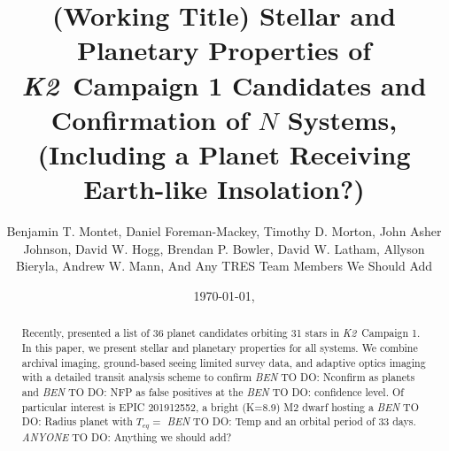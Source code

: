 \documentclass{emulateapj}
\newcommand{\project}[1]{\textsl{#1}}
\newcommand{\KT}{\project{K2}}
\newcommand{\paperit}{\citet{Foreman-Mackey15}}
\newcommand{\todo}[3]{{\color{#2} \emph{#1} TO DO: #3}}
\newcommand{\btmtodo}[1]{\todo{BEN}{red}{#1}}
\newcommand{\anytodo}[1]{\todo{ANYONE}{NavyBlue}{#1}}
\begin{document}
\title{(Working Title) Stellar and Planetary Properties of \KT\ Campaign 1
Candidates and Confirmation of $N$ Systems, (Including a Planet Receiving 
Earth-like Insolation?)}

\author{
Benjamin T. Montet, 
Daniel Foreman-Mackey,
Timothy D. Morton,
John Asher Johnson,
David W. Hogg,
Brendan P. Bowler,
David W. Latham,
Allyson Bieryla,
Andrew W. Mann,
And Any TRES Team Members We Should Add
}




\date{\today, \currenttime}

\begin{abstract}
Recently, \paperit{} presented a list of 36 planet candidates orbiting
31 stars in \KT\ Campaign 1. 
In this paper, we present stellar and planetary properties for all systems.
We combine archival imaging, ground-based seeing limited survey data, and
adaptive optics imaging with a detailed transit analysis scheme to confirm 
\btmtodo{Nconfirm} as planets and \btmtodo{NFP} as false positives
at the \btmtodo{confidence} level.
Of particular interest is EPIC 201912552, a bright (K=8.9) M2 dwarf
hosting a \btmtodo{Radius} planet with $T_{eq} = $\btmtodo{Temp} and an 
orbital period of 33 days.
\anytodo{Anything we should add?}
\end{abstract}

\keywords{\btmtodo{Keywords}}

\maketitle
\end{document}
